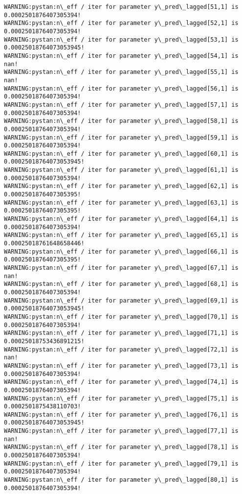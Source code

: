 \documentclass[11pt]{article}
\begin{document}
\begin{Verbatim}[commandchars=\\\{\}]
WARNING:pystan:n\_eff / iter for parameter y\_pred\_lagged[51,1] is 0.0002501876407305394!
WARNING:pystan:n\_eff / iter for parameter y\_pred\_lagged[52,1] is 0.0002501876407305394!
WARNING:pystan:n\_eff / iter for parameter y\_pred\_lagged[53,1] is 0.00025018764073053945!
WARNING:pystan:n\_eff / iter for parameter y\_pred\_lagged[54,1] is nan!
WARNING:pystan:n\_eff / iter for parameter y\_pred\_lagged[55,1] is nan!
WARNING:pystan:n\_eff / iter for parameter y\_pred\_lagged[56,1] is 0.0002501876407305394!
WARNING:pystan:n\_eff / iter for parameter y\_pred\_lagged[57,1] is 0.0002501876407305394!
WARNING:pystan:n\_eff / iter for parameter y\_pred\_lagged[58,1] is 0.0002501876407305394!
WARNING:pystan:n\_eff / iter for parameter y\_pred\_lagged[59,1] is 0.0002501876407305394!
WARNING:pystan:n\_eff / iter for parameter y\_pred\_lagged[60,1] is 0.00025018764073053945!
WARNING:pystan:n\_eff / iter for parameter y\_pred\_lagged[61,1] is 0.0002501876407305394!
WARNING:pystan:n\_eff / iter for parameter y\_pred\_lagged[62,1] is 0.0002501876407305395!
WARNING:pystan:n\_eff / iter for parameter y\_pred\_lagged[63,1] is 0.0002501876407305395!
WARNING:pystan:n\_eff / iter for parameter y\_pred\_lagged[64,1] is 0.0002501876407305394!
WARNING:pystan:n\_eff / iter for parameter y\_pred\_lagged[65,1] is 0.00025018761648658446!
WARNING:pystan:n\_eff / iter for parameter y\_pred\_lagged[66,1] is 0.0002501876407305395!
WARNING:pystan:n\_eff / iter for parameter y\_pred\_lagged[67,1] is nan!
WARNING:pystan:n\_eff / iter for parameter y\_pred\_lagged[68,1] is 0.0002501876407305394!
WARNING:pystan:n\_eff / iter for parameter y\_pred\_lagged[69,1] is 0.00025018764073053945!
WARNING:pystan:n\_eff / iter for parameter y\_pred\_lagged[70,1] is 0.0002501876407305394!
WARNING:pystan:n\_eff / iter for parameter y\_pred\_lagged[71,1] is 0.00025018753436891215!
WARNING:pystan:n\_eff / iter for parameter y\_pred\_lagged[72,1] is nan!
WARNING:pystan:n\_eff / iter for parameter y\_pred\_lagged[73,1] is 0.0002501876407305394!
WARNING:pystan:n\_eff / iter for parameter y\_pred\_lagged[74,1] is 0.0002501876407305394!
WARNING:pystan:n\_eff / iter for parameter y\_pred\_lagged[75,1] is 0.0002501875438110703!
WARNING:pystan:n\_eff / iter for parameter y\_pred\_lagged[76,1] is 0.00025018764073053945!
WARNING:pystan:n\_eff / iter for parameter y\_pred\_lagged[77,1] is nan!
WARNING:pystan:n\_eff / iter for parameter y\_pred\_lagged[78,1] is 0.0002501876407305394!
WARNING:pystan:n\_eff / iter for parameter y\_pred\_lagged[79,1] is 0.0002501876407305394!
WARNING:pystan:n\_eff / iter for parameter y\_pred\_lagged[80,1] is 0.0002501876407305394!

\end{Verbatim}
\end{document}
